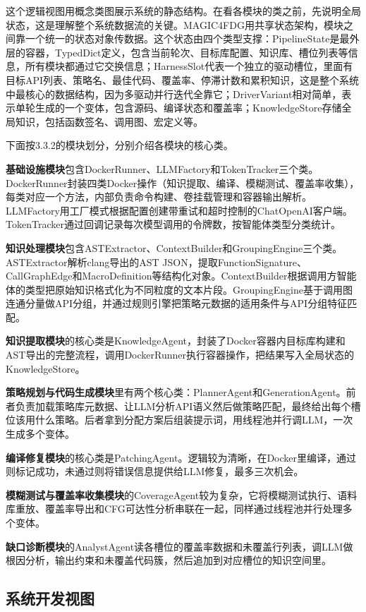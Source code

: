 这个逻辑视图用概念类图展示系统的静态结构。在看各模块的类之前，先说明全局状态，这是理解整个系统数据流的关键。MAGIC4FDG用共享状态架构，模块之间靠一个统一的状态对象传数据。这个状态由四个类型支撑：PipelineState是最外层的容器，TypedDict定义，包含当前轮次、目标库配置、知识库、槽位列表等信息，所有模块都通过它交换信息；HarnessSlot代表一个独立的驱动槽位，里面有目标API列表、策略名、最佳代码、覆盖率、停滞计数和累积知识，这是整个系统中最核心的数据结构，因为多驱动并行迭代全靠它；DriverVariant相对简单，表示单轮生成的一个变体，包含源码、编译状态和覆盖率；KnowledgeStore存储全局知识，包括函数签名、调用图、宏定义等。

下面按3.3.2的模块划分，分别介绍各模块的核心类。

\textbf{基础设施模块}包含DockerRunner、LLMFactory和TokenTracker三个类。DockerRunner封装四类Docker操作（知识提取、编译、模糊测试、覆盖率收集），每类对应一个方法，内部负责命令构建、卷挂载管理和容器输出解析。LLMFactory用工厂模式根据配置创建带重试和超时控制的ChatOpenAI客户端。TokenTracker通过回调记录每次模型调用的令牌数，按智能体类型分类统计。

\textbf{知识处理模块}包含ASTExtractor、ContextBuilder和GroupingEngine三个类。ASTExtractor解析clang导出的AST JSON，提取FunctionSignature、CallGraphEdge和MacroDefinition等结构化对象。ContextBuilder根据调用方智能体的类型把原始知识格式化为不同粒度的文本片段。GroupingEngine基于调用图连通分量做API分组，并通过规则引擎把策略元数据的适用条件与API分组特征匹配。

\textbf{知识提取模块}的核心类是KnowledgeAgent，封装了Docker容器内目标库构建和AST导出的完整流程，调用DockerRunner执行容器操作，把结果写入全局状态的KnowledgeStore。

\textbf{策略规划与代码生成模块}里有两个核心类：PlannerAgent和GenerationAgent。前者负责加载策略库元数据、让LLM分析API语义然后做策略匹配，最终给出每个槽位该用什么策略。后者拿到分配方案后组装提示词，用线程池并行调LLM，一次生成多个变体。

\textbf{编译修复模块}的核心类是PatchingAgent。逻辑较为清晰，在Docker里编译，通过则标记成功，未通过则将错误信息提供给LLM修复，最多三次机会。

\textbf{模糊测试与覆盖率收集模块}的CoverageAgent较为复杂，它将模糊测试执行、语料库重放、覆盖率导出和CFG可达性分析串联在一起，同样通过线程池并行处理多个变体。

\textbf{缺口诊断模块}的AnalystAgent读各槽位的覆盖率数据和未覆盖行列表，调LLM做根因分析，输出约束和未覆盖代码簇，然后追加到对应槽位的知识空间里。

\subsection{系统开发视图}

